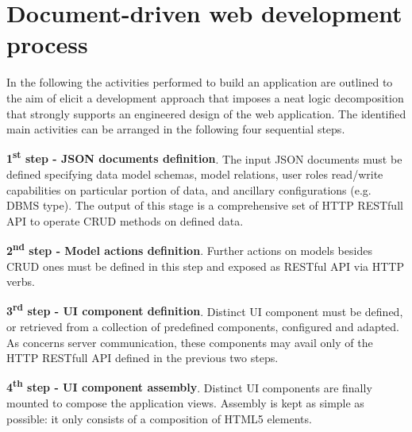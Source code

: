 \section{Document-driven web development process}\label{sec:dev-proc}

In the following the activities performed to build an application are outlined to the aim of elicit a development approach that imposes a neat logic decomposition that strongly supports an engineered design of the web application. The identified main activities can be arranged in the following four sequential steps.

{\bf 1\textsuperscript{st} step - JSON documents definition}. The input JSON documents must be defined specifying data model schemas, model relations, user roles read/write capabilities on particular portion of data, and ancillary configurations (e.g. DBMS type). The output of this stage is a comprehensive set of HTTP RESTfull API to operate CRUD methods on defined data.

{\bf 2\textsuperscript{nd} step - Model actions definition}. Further actions on models besides CRUD ones must be defined in this step and exposed as RESTful API via HTTP verbs.

{\bf 3\textsuperscript{rd} step - UI component definition}. Distinct UI component must be defined, or retrieved from a collection of predefined components, configured and adapted. As concerns server communication, these components may avail only of the HTTP RESTfull API defined in the previous two steps.

{\bf 4\textsuperscript{th} step - UI component assembly}. Distinct UI components are finally mounted to compose the application views. Assembly is kept as simple as possible: it only consists of a composition of HTML5 elements.




